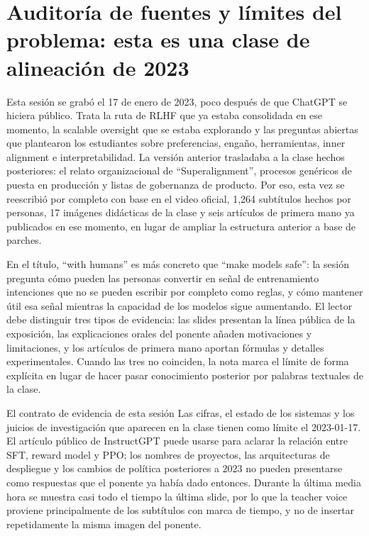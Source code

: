 \section{Auditoría de fuentes y límites del problema: esta es una clase de alineación de 2023}

Esta sesión se grabó el 17 de enero de 2023, poco después de que ChatGPT se hiciera público. Trata la ruta de RLHF que ya estaba consolidada en ese momento, la scalable oversight que se estaba explorando y las preguntas abiertas que plantearon los estudiantes sobre preferencias, engaño, herramientas, inner alignment e interpretabilidad. La versión anterior trasladaba a la clase hechos posteriores: el relato organizacional de ``Superalignment'', procesos genéricos de puesta en producción y listas de gobernanza de producto. Por eso, esta vez se reescribió por completo con base en el video oficial, 1,264 subtítulos hechos por personas, 17 imágenes didácticas de la clase y seis artículos de primera mano ya publicados en ese momento, en lugar de ampliar la estructura anterior a base de parches.


En el título, ``with humans'' es más concreto que ``make models safe'': la sesión pregunta cómo pueden las personas convertir en señal de entrenamiento intenciones que no se pueden escribir por completo como reglas, y cómo mantener útil esa señal mientras la capacidad de los modelos sigue aumentando. El lector debe distinguir tres tipos de evidencia: las slides presentan la línea pública de la exposición, las explicaciones orales del ponente añaden motivaciones y limitaciones, y los artículos de primera mano aportan fórmulas y detalles experimentales. Cuando las tres no coinciden, la nota marca el límite de forma explícita en lugar de hacer pasar conocimiento posterior por palabras textuales de la clase.

\begin{importantbox}{El contrato de evidencia de esta sesión}
Las cifras, el estado de los sistemas y los juicios de investigación que aparecen en la clase tienen como límite el 2023-01-17. El artículo público de InstructGPT puede usarse para aclarar la relación entre SFT, reward model y PPO; los nombres de proyectos, las arquitecturas de despliegue y los cambios de política posteriores a 2023 no pueden presentarse como respuestas que el ponente ya había dado entonces. Durante la última media hora se muestra casi todo el tiempo la última slide, por lo que la teacher voice proviene principalmente de los subtítulos con marca de tiempo, y no de insertar repetidamente la misma imagen del ponente.
\end{importantbox}

